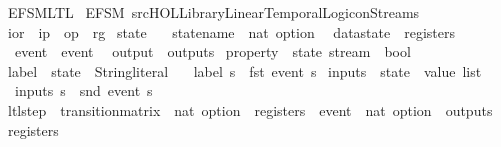 %
\begin{isabellebody}%
%
%
\isadelimtheory
%
\endisadelimtheory
%
\isatagtheory
{}\isamarkupfalse%
\ EFSM{\isacharunderscore}LTL\isanewline
{}\ {\isachardoublequoteopen}EFSM{\isachardoublequoteclose}\ {\isachardoublequoteopen}{\isachartilde}{\isachartilde}{\isacharslash}src{\isacharslash}HOL{\isacharslash}Library{\isacharslash}Linear{\isacharunderscore}Temporal{\isacharunderscore}Logic{\isacharunderscore}on{\isacharunderscore}Streams{\isachardoublequoteclose}\isanewline
{}%
\endisatagtheory
{\isafoldtheory}%
%
\isadelimtheory
\isanewline
%
\endisadelimtheory
\isanewline
{}\isamarkupfalse%
\ ior\ {\isacharequal}\ ip\ {\isacharbar}\ op\ {\isacharbar}\ rg\isanewline
\isanewline
{}\isamarkupfalse%
\ state\ {\isacharequal}\isanewline
\ \ statename\ {\isacharcolon}{\isacharcolon}\ {\isachardoublequoteopen}nat\ option{\isachardoublequoteclose}\isanewline
\ \ datastate\ {\isacharcolon}{\isacharcolon}\ registers\isanewline
\ \ event\ {\isacharcolon}{\isacharcolon}\ event\isanewline
\ \ {\isachardoublequoteopen}output{\isachardoublequoteclose}\ {\isacharcolon}{\isacharcolon}\ outputs\isanewline
\isanewline
{}\isamarkupfalse%
\ property\ {\isacharequal}\ {\isachardoublequoteopen}state\ stream\ {\isasymRightarrow}\ bool{\isachardoublequoteclose}\isanewline
\isanewline
{}\isamarkupfalse%
\ label\ {\isacharcolon}{\isacharcolon}\ {\isachardoublequoteopen}state\ {\isasymRightarrow}\ String{\isachardot}literal{\isachardoublequoteclose}\ \isanewline
\ \ {\isachardoublequoteopen}label\ s\ {\isasymequiv}\ fst\ {\isacharparenleft}event\ s{\isacharparenright}{\isachardoublequoteclose}\isanewline
\isanewline
{}\isamarkupfalse%
\ inputs\ {\isacharcolon}{\isacharcolon}\ {\isachardoublequoteopen}state\ {\isasymRightarrow}\ value\ list{\isachardoublequoteclose}\ \isanewline
\ \ {\isachardoublequoteopen}inputs\ s\ {\isasymequiv}\ snd\ {\isacharparenleft}event\ s{\isacharparenright}{\isachardoublequoteclose}\isanewline
\isanewline
{}\isamarkupfalse%
\ ltl{\isacharunderscore}step\ {\isacharcolon}{\isacharcolon}\ {\isachardoublequoteopen}transition{\isacharunderscore}matrix\ {\isasymRightarrow}\ nat\ option\ {\isasymRightarrow}\ registers\ {\isasymRightarrow}\ event\ {\isasymRightarrow}\ {\isacharparenleft}nat\ option\ {\isasymtimes}\ outputs\ {\isasymtimes}\ registers{\isacharparenright}{\isachardoublequoteclose}\ \isanewline

\end{isabellebody}

